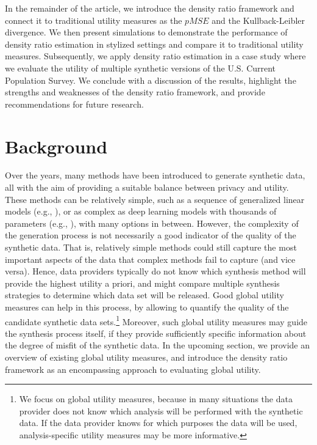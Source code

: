 \documentclass[
]{article}
\begin{document}
In the remainder of the article, we introduce the density ratio
framework and connect it to traditional utility measures as the \(pMSE\)
and the Kullback-Leibler divergence. We then present simulations to
demonstrate the performance of density ratio estimation in stylized
settings and compare it to traditional utility measures. Subsequently,
we apply density ratio estimation in a case study where we evaluate the
utility of multiple synthetic versions of the U.S. Current Population
Survey. We conclude with a discussion of the results, highlight the
strengths and weaknesses of the density ratio framework, and provide
recommendations for future research.

\section{Background}\label{background}

Over the years, many methods have been introduced to generate synthetic
data, all with the aim of providing a suitable balance between privacy
and utility. These methods can be relatively simple, such as a sequence
of generalized linear models (e.g.,
), or as complex as
deep learning models with thousands of parameters (e.g.,
), with many options in
between. However, the complexity of the generation process is not
necessarily a good indicator of the quality of the synthetic data. That
is, relatively simple methods could still capture the most important
aspects of the data that complex methods fail to capture (and vice
versa). Hence, data providers typically do not know which synthesis
method will provide the highest utility a priori, and might compare
multiple synthesis strategies to determine which data set will be
released. Good global utility measures can help in this process, by
allowing to quantify the quality of the candidate synthetic data
sets.\footnote{We focus on global utility measures, because in many
  situations the data provider does not know which analysis will be
  performed with the synthetic data. If the data provider knows for
  which purposes the data will be used, analysis-specific utility
  measures may be more informative.} Moreover, such global utility
measures may guide the synthesis process itself, if they provide
sufficiently specific information about the degree of misfit of the
synthetic data. In the upcoming section, we provide an overview of
existing global utility measures, and introduce the density ratio
framework as an encompassing approach to evaluating global utility.
\end{document}
